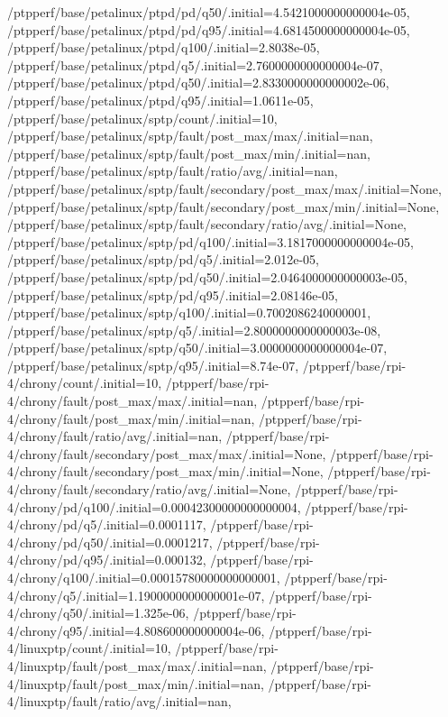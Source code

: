 {    /ptpperf/base/petalinux/ptpd/pd/q50/.initial=4.5421000000000004e-05,
    /ptpperf/base/petalinux/ptpd/pd/q95/.initial=4.6814500000000004e-05,
    /ptpperf/base/petalinux/ptpd/q100/.initial=2.8038e-05,
    /ptpperf/base/petalinux/ptpd/q5/.initial=2.7600000000000004e-07,
    /ptpperf/base/petalinux/ptpd/q50/.initial=2.8330000000000002e-06,
    /ptpperf/base/petalinux/ptpd/q95/.initial=1.0611e-05,
    /ptpperf/base/petalinux/sptp/count/.initial=10,
    /ptpperf/base/petalinux/sptp/fault/post_max/max/.initial=nan,
    /ptpperf/base/petalinux/sptp/fault/post_max/min/.initial=nan,
    /ptpperf/base/petalinux/sptp/fault/ratio/avg/.initial=nan,
    /ptpperf/base/petalinux/sptp/fault/secondary/post_max/max/.initial=None,
    /ptpperf/base/petalinux/sptp/fault/secondary/post_max/min/.initial=None,
    /ptpperf/base/petalinux/sptp/fault/secondary/ratio/avg/.initial=None,
    /ptpperf/base/petalinux/sptp/pd/q100/.initial=3.1817000000000004e-05,
    /ptpperf/base/petalinux/sptp/pd/q5/.initial=2.012e-05,
    /ptpperf/base/petalinux/sptp/pd/q50/.initial=2.0464000000000003e-05,
    /ptpperf/base/petalinux/sptp/pd/q95/.initial=2.08146e-05,
    /ptpperf/base/petalinux/sptp/q100/.initial=0.7002086240000001,
    /ptpperf/base/petalinux/sptp/q5/.initial=2.8000000000000003e-08,
    /ptpperf/base/petalinux/sptp/q50/.initial=3.0000000000000004e-07,
    /ptpperf/base/petalinux/sptp/q95/.initial=8.74e-07,
    /ptpperf/base/rpi-4/chrony/count/.initial=10,
    /ptpperf/base/rpi-4/chrony/fault/post_max/max/.initial=nan,
    /ptpperf/base/rpi-4/chrony/fault/post_max/min/.initial=nan,
    /ptpperf/base/rpi-4/chrony/fault/ratio/avg/.initial=nan,
    /ptpperf/base/rpi-4/chrony/fault/secondary/post_max/max/.initial=None,
    /ptpperf/base/rpi-4/chrony/fault/secondary/post_max/min/.initial=None,
    /ptpperf/base/rpi-4/chrony/fault/secondary/ratio/avg/.initial=None,
    /ptpperf/base/rpi-4/chrony/pd/q100/.initial=0.00042300000000000004,
    /ptpperf/base/rpi-4/chrony/pd/q5/.initial=0.0001117,
    /ptpperf/base/rpi-4/chrony/pd/q50/.initial=0.0001217,
    /ptpperf/base/rpi-4/chrony/pd/q95/.initial=0.000132,
    /ptpperf/base/rpi-4/chrony/q100/.initial=0.00015780000000000001,
    /ptpperf/base/rpi-4/chrony/q5/.initial=1.1900000000000001e-07,
    /ptpperf/base/rpi-4/chrony/q50/.initial=1.325e-06,
    /ptpperf/base/rpi-4/chrony/q95/.initial=4.808600000000004e-06,
    /ptpperf/base/rpi-4/linuxptp/count/.initial=10,
    /ptpperf/base/rpi-4/linuxptp/fault/post_max/max/.initial=nan,
    /ptpperf/base/rpi-4/linuxptp/fault/post_max/min/.initial=nan,
    /ptpperf/base/rpi-4/linuxptp/fault/ratio/avg/.initial=nan,
}
